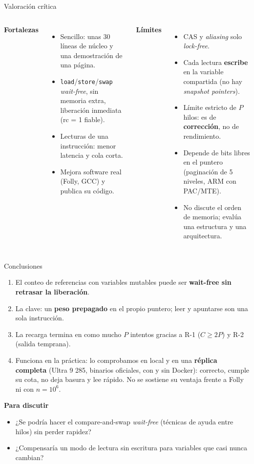 \documentclass[aspectratio=169,11pt]{beamer}
\newcommand{\clave}[1]{\textcolor{acento}{\textbf{#1}}}
\begin{document}
\begin{frame}{Valoración crítica}
  \begin{columns}[T]
    \textbf{\textcolor{ok}{Fortalezas}}
    \begin{itemize}\small
      \item Sencillo: unas 30 líneas de núcleo y una demostración de una página.
      \item \texttt{load}/\texttt{store}/\texttt{swap} \emph{wait-free}, sin memoria extra, liberación inmediata (rc = 1 fiable).
      \item Lecturas de una instrucción: menor latencia y cola corta.
      \item Mejora software real (Folly, GCC) y publica su código.
    \end{itemize}
    \textbf{\textcolor{mal}{Límites}}
    \begin{itemize}\small
      \item CAS y \emph{aliasing} solo \emph{lock-free}.
      \item Cada lectura \textbf{escribe} en la variable compartida (no hay \emph{snapshot pointers}).
      \item Límite estricto de $P$ hilos: es de \textbf{corrección}, no de rendimiento.
      \item Depende de bits libres en el puntero (paginación de 5 niveles, ARM con PAC/MTE).
      \item No discute el orden de memoria; evalúa una estructura y una arquitectura.
    \end{itemize}
  \end{columns}
\end{frame}

\begin{frame}{Conclusiones}
  \begin{enumerate}
    \item El conteo de referencias con variables mutables puede ser \clave{wait-free sin retrasar la liberación}.
    \item La clave: un \textbf{peso prepagado} en el propio puntero; leer y apuntarse son una sola instrucción.
    \item La recarga termina en como mucho $P$ intentos gracias a R-1 ($C \ge 2P$) y R-2 (salida temprana).
    \item Funciona en la práctica: lo comprobamos en local y en una \textbf{réplica completa} (Ultra 9 285, binarios oficiales, con y sin Docker): correcto, cumple su cota, no deja basura y lee rápido. No se sostiene su ventaja frente a Folly ni con $n = 10^6$.
  \end{enumerate}
  \bigskip
  \textbf{Para discutir}
  \begin{itemize}\small
    \item ¿Se podría hacer el compare-and-swap \emph{wait-free} (técnicas de ayuda entre hilos) sin perder rapidez?
    \item ¿Compensaría un modo de lectura sin escritura para variables que casi nunca cambian?
  \end{itemize}
\end{frame}
\end{document}
